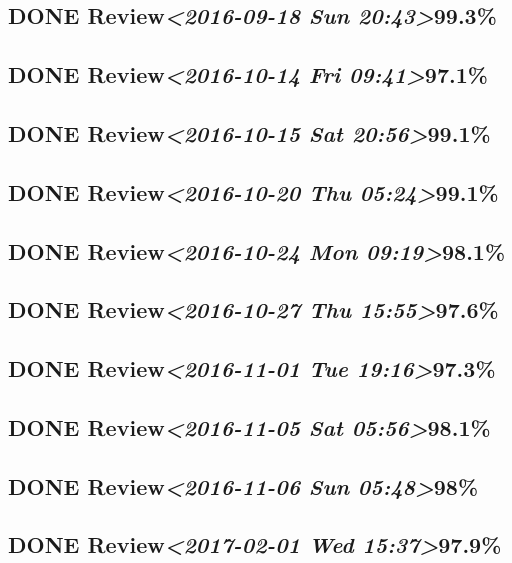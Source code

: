 \documentclass[11pt]{ctexart}
\begin{document}
\subsection{{\bfseries\sffamily DONE} Review\textit{<2016-09-18 Sun 20:43>}99.3\%}
\label{sec:org0dbc0a3}
\subsection{{\bfseries\sffamily DONE} Review\textit{<2016-10-14 Fri 09:41>}97.1\%}
\label{sec:org9d01b29}
\subsection{{\bfseries\sffamily DONE} Review\textit{<2016-10-15 Sat 20:56>}99.1\%}
\label{sec:org238977e}
\subsection{{\bfseries\sffamily DONE} Review\textit{<2016-10-20 Thu 05:24>}99.1\%}
\label{sec:org3465528}
\subsection{{\bfseries\sffamily DONE} Review\textit{<2016-10-24 Mon 09:19>}98.1\%}
\label{sec:org14e3cb9}
\subsection{{\bfseries\sffamily DONE} Review\textit{<2016-10-27 Thu 15:55>}97.6\%}
\label{sec:org9e777e8}
\subsection{{\bfseries\sffamily DONE} Review\textit{<2016-11-01 Tue 19:16>}97.3\%}
\label{sec:orgcce7fa0}
\subsection{{\bfseries\sffamily DONE} Review\textit{<2016-11-05 Sat 05:56>}98.1\%}
\label{sec:orgea91a4b}
\subsection{{\bfseries\sffamily DONE} Review\textit{<2016-11-06 Sun 05:48>}98\%}
\label{sec:orge1f7994}
\subsection{{\bfseries\sffamily DONE} Review\textit{<2017-02-01 Wed 15:37>}97.9\%}
\label{sec:org1d84a3f}
\end{document}
